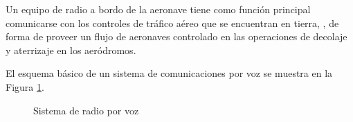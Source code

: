 Un equipo de radio a bordo de la aeronave tiene como funci\'on principal comunicarse con los controles de tr\'afico a\'ereo que se encuentran en tierra, , de forma de proveer un flujo de aeronaves controlado en las operaciones de decolaje y aterrizaje en los aer\'odromos. 

El esquema b\'asico de un sistema de comunicaciones por voz se muestra en la Figura \ref{fig:sistema.radio.x.voz}.

\begin{figure}[!h]
  \centering
  \caption{Sistema de radio por voz}
  \label{fig:sistema.radio.x.voz}
\end{figure}